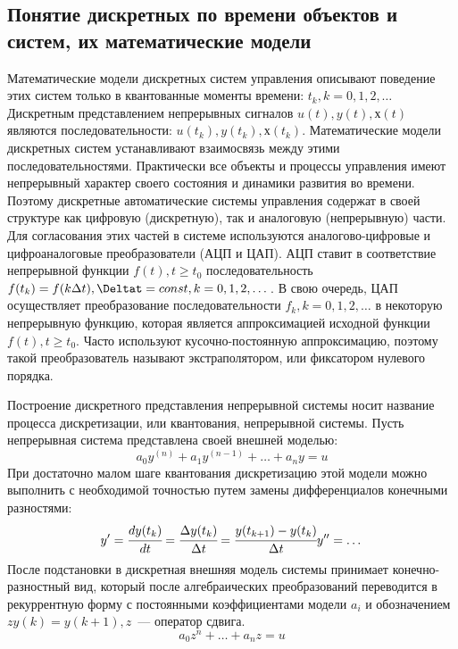 \subsection{Понятие дискретных по времени объектов и систем, их математические модели}

Математические модели дискретных систем управления описывают поведение этих систем только в квантованные моменты времени: $t_k, k = 0, 1, 2, \dots$ Дискретным представлением непрерывных сигналов $u(t), y(t), х(t)$ являются последовательности: ${u(t_k)}, {y(t_k)}, {х(t_k)}$.
Математические модели дискретных систем устанавливают взаимосвязь между этими последовательностями.
Практически все объекты и процессы управления имеют непрерывный характер своего состояния и динамики развития во времени. Поэтому дискретные автоматические системы управления содержат в своей структуре как цифровую (дискретную), так и аналоговую (непрерывную) части. Для согласования этих частей в системе используются аналогово-цифровые и цифроаналоговые преобразователи (АЦП и ЦАП). АЦП ставит в соответствие непрерывной функции $f(t), t \ge t_0$ последовательность ${f(t_k)}=f(k \Delta t), \Deltat=const, k = 0, 1, 2,\dots$. В свою очередь, ЦАП осуществляет преобразование последовательности ${f_k, k = 0, 1, 2, \dots}$ в некоторую непрерывную функцию, которая является аппроксимацией исходной функции $f(t), t \ge t_0$. Часто используют кусочно-постоянную аппроксимацию, поэтому такой преобразователь называют экстраполятором, или фиксатором нулевого порядка.

Построение дискретного представления непрерывной системы носит название процесса дискретизации, или квантования, непрерывной системы. Пусть непрерывная система представлена своей внешней моделью:
\begin{equation}
    a_0 y^{(n)} + a_1 y^{(n-1)} + \dots + a_n y = u
\end{equation}
При достаточно малом шаге квантования дискретизацию этой модели можно выполнить с необходимой точностью путем замены дифференциалов конечными разностями:
\begin{equation}
    y' = \cfrac{d y(t_k)}{dt} = \cfrac{\Delta y(t_k)}{\Delta t} = \cfrac{y(t_{k+1}) - y(t_k)}{\Delta t}
    y'' = \dots
\end{equation}
После подстановки в дискретная внешняя модель системы принимает конечно-разностный вид, который после алгебраических преобразований переводится в рекуррентную форму с постоянными коэффициентами модели $a_i$ и обозначением $z y(k) = y(k+1), z$~--- оператор сдвига.
\begin{equation}
    a_0 z^{n} + \dots + a_n z = u
\end{equation}

